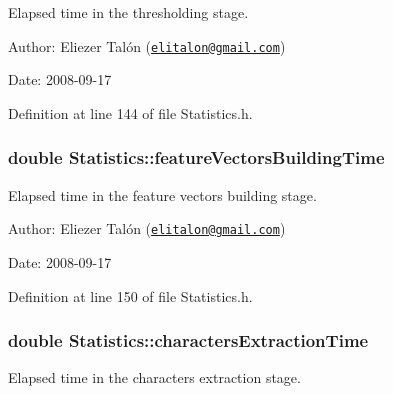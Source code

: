 Elapsed time in the thresholding stage. 

\begin{Desc}
\item[Author:]Eliezer Talón (\href{mailto:elitalon@gmail.com}{\tt elitalon@gmail.com}) \end{Desc}
\begin{Desc}
\item[Date:]2008-09-17 \end{Desc}


Definition at line 144 of file Statistics.h.\hypertarget{class_statistics_ae46d5f7b2a374dd79b15533facc9e6c}{
\subsubsection[featureVectorsBuildingTime]{\setlength{\rightskip}{0pt plus 5cm}double {\bf Statistics::featureVectorsBuildingTime}}}
\label{class_statistics_ae46d5f7b2a374dd79b15533facc9e6c}


Elapsed time in the feature vectors building stage. 

\begin{Desc}
\item[Author:]Eliezer Talón (\href{mailto:elitalon@gmail.com}{\tt elitalon@gmail.com}) \end{Desc}
\begin{Desc}
\item[Date:]2008-09-17 \end{Desc}


Definition at line 150 of file Statistics.h.\hypertarget{class_statistics_1e09de36cf3a65ab2a471e877578257d}{
\subsubsection[charactersExtractionTime]{\setlength{\rightskip}{0pt plus 5cm}double {\bf Statistics::charactersExtractionTime}}}
\label{class_statistics_1e09de36cf3a65ab2a471e877578257d}


Elapsed time in the characters extraction stage. 

